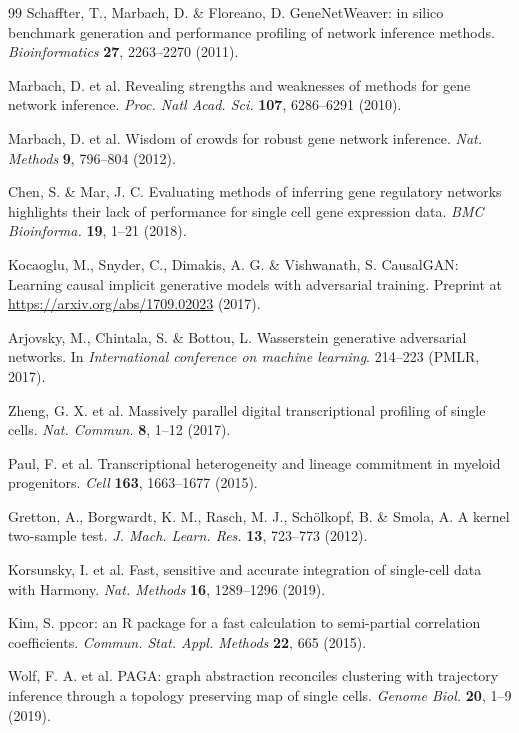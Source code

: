 \begin{singlespace}
\begin{thebibliography}{99\kern\bibindent}
Schaffter, T., Marbach, D. \& Floreano, D. GeneNetWeaver: in silico
benchmark generation and performance profiling of network
inference methods. \textit{Bioinformatics} \textbf{27}, 2263–2270 (2011).

Marbach, D. et al. Revealing strengths and weaknesses of methods
for gene network inference. \textit{Proc. Natl Acad. Sci.} \textbf{107}, 6286–6291 (2010).

Marbach, D. et al. Wisdom of crowds for robust gene network
inference. \textit{Nat. Methods} \textbf{9}, 796–804 (2012).

Chen, S. \& Mar, J. C. Evaluating methods of inferring gene regulatory networks highlights their lack of performance for single cell
gene expression data. \textit{BMC Bioinforma.} \textbf{19}, 1–21 (2018).

Kocaoglu, M., Snyder, C., Dimakis, A. G. \& Vishwanath, S. CausalGAN: Learning causal implicit generative models with adversarial training. Preprint at \href{https://arxiv.org/abs/1709.02023}{https://arxiv.org/abs/1709.02023} (2017).

Arjovsky, M., Chintala, S. \& Bottou, L. Wasserstein generative
adversarial networks. In \textit{International conference on machine
learning}. 214–223 (PMLR, 2017).

Zheng, G. X. et al. Massively parallel digital transcriptional profiling
of single cells. \textit{Nat. Commun.} \textbf{8}, 1–12 (2017).

Paul, F. et al. Transcriptional heterogeneity and lineage commitment in myeloid progenitors. \textit{Cell} \textbf{163}, 1663–1677 (2015).

Gretton, A., Borgwardt, K. M., Rasch, M. J., Schölkopf, B. \& Smola, A.
A kernel two-sample test. \textit{J. Mach. Learn. Res.} \textbf{13}, 723–773 (2012).

Korsunsky, I. et al. Fast, sensitive and accurate integration of single-cell data with Harmony. \textit{Nat. Methods} \textbf{16}, 1289–1296 (2019).

Kim, S. ppcor: an R package for a fast calculation to semi-partial
correlation coefficients. \textit{Commun. Stat. Appl. Methods} \textbf{22}, 665 (2015).

Wolf, F. A. et al. PAGA: graph abstraction reconciles clustering with
trajectory inference through a topology preserving map of single
cells. \textit{Genome Biol.} \textbf{20}, 1–9 (2019).


\end{thebibliography}
\end{singlespace}
